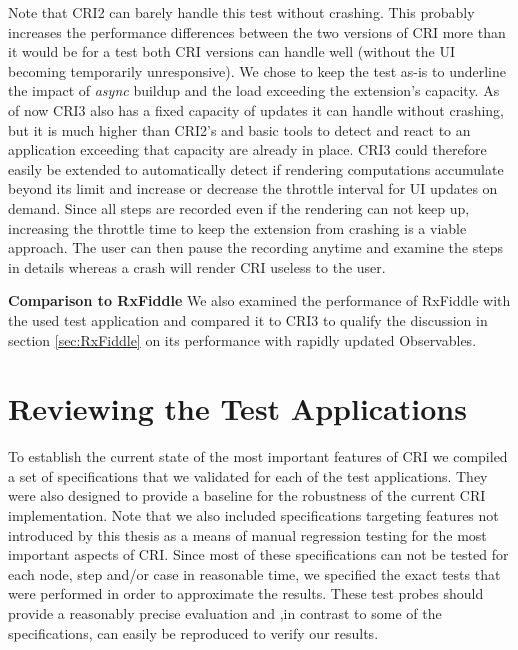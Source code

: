 	Note that CRI2 can barely handle this test without crashing. This probably increases the performance differences between the two versions of CRI more than it would be for a test both CRI versions can handle well (without the UI becoming temporarily unresponsive). We chose to keep the test as-is to underline the impact of \emph{async} buildup and the load exceeding the extension's capacity. As of now CRI3 also has a fixed capacity of updates it can handle without crashing, but it is much higher than CRI2's and basic tools to detect and react to an application exceeding that capacity are already in place. CRI3 could therefore easily be extended to automatically detect if rendering computations accumulate beyond its limit and increase or decrease the throttle interval for UI updates on demand. Since all steps are recorded even if the rendering can not keep up, increasing the throttle time to keep the extension from crashing is a viable approach. The user can then pause the recording anytime and examine the steps in details whereas a crash will render CRI useless to the user.
	
	\textbf{Comparison to RxFiddle}
	We also examined the performance of RxFiddle with the used test application and compared it to CRI3 to qualify the discussion in section \ref{sec:RxFiddle} on its performance with rapidly updated Observables.
	
\section{Reviewing the Test Applications}
To establish the current state of the most important features of CRI we compiled a set of specifications that we validated for each of the test applications. They were also designed to provide a baseline for the robustness of the current CRI implementation. Note that we also included specifications targeting features not introduced by this thesis as a means of manual regression testing for the most important aspects of CRI. Since most of these specifications can not be tested for each node, step and/or case in reasonable time, we specified the exact tests that were performed in order to approximate the results. These test probes should provide a reasonably precise evaluation and ,in contrast to some of the specifications, can easily be reproduced to verify our results.

